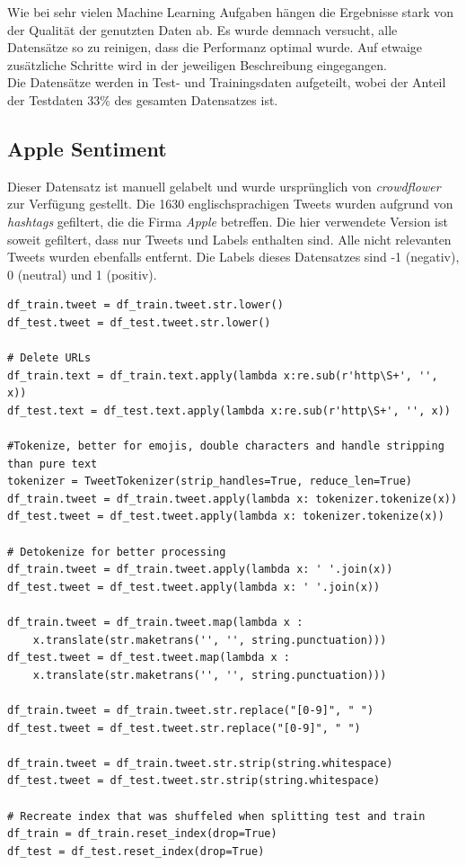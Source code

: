 Wie bei sehr vielen Machine Learning Aufgaben h\"angen die Ergebnisse stark von der Qualit\"at der genutzten Daten ab. Es wurde demnach versucht, alle Datens\"atze so zu reinigen, dass die Performanz optimal wurde. Auf etwaige zus\"atzliche Schritte wird in der jeweiligen Beschreibung eingegangen.\\
Die Datens\"atze werden in Test- und Trainingsdaten aufgeteilt, wobei der Anteil der Testdaten 33\% des gesamten Datensatzes ist.


\subsection{Apple Sentiment}
\label{sec:applesent}
Dieser Datensatz ist manuell gelabelt und wurde urspr\"unglich von \textit{crowdflower} \cite{crowdflower} zur Verf\"ugung gestellt. Die 1630 englischsprachigen Tweets wurden aufgrund von \textit{hashtags} gefiltert, die die Firma \textit{Apple} betreffen. Die hier verwendete Version \cite{apple_sent} ist soweit gefiltert, dass nur Tweets und Labels enthalten sind. Alle nicht relevanten Tweets wurden ebenfalls entfernt. Die Labels dieses Datensatzes sind -1 (negativ), 0 (neutral) und 1 (positiv).\\
\lstset{language=Python}
\lstset{frame=lines}
\lstset{captionpos=b}
\lstset{basicstyle=\footnotesize}
\begin{lstlisting}
df_train.tweet = df_train.tweet.str.lower()
df_test.tweet = df_test.tweet.str.lower()

# Delete URLs
df_train.text = df_train.text.apply(lambda x:re.sub(r'http\S+', '', x))
df_test.text = df_test.text.apply(lambda x:re.sub(r'http\S+', '', x))

#Tokenize, better for emojis, double characters and handle stripping than pure text
tokenizer = TweetTokenizer(strip_handles=True, reduce_len=True)
df_train.tweet = df_train.tweet.apply(lambda x: tokenizer.tokenize(x))
df_test.tweet = df_test.tweet.apply(lambda x: tokenizer.tokenize(x))

# Detokenize for better processing
df_train.tweet = df_train.tweet.apply(lambda x: ' '.join(x))
df_test.tweet = df_test.tweet.apply(lambda x: ' '.join(x))

df_train.tweet = df_train.tweet.map(lambda x : 
	x.translate(str.maketrans('', '', string.punctuation)))
df_test.tweet = df_test.tweet.map(lambda x : 
	x.translate(str.maketrans('', '', string.punctuation)))

df_train.tweet = df_train.tweet.str.replace("[0-9]", " ")
df_test.tweet = df_test.tweet.str.replace("[0-9]", " ")

df_train.tweet = df_train.tweet.str.strip(string.whitespace)
df_test.tweet = df_test.tweet.str.strip(string.whitespace)

# Recreate index that was shuffeled when splitting test and train
df_train = df_train.reset_index(drop=True)
df_test = df_test.reset_index(drop=True)
\end{lstlisting}
